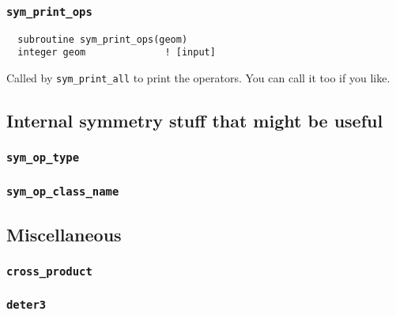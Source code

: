 \subsubsection{{\tt sym\_print\_ops}}
\begin{verbatim}
  subroutine sym_print_ops(geom)
  integer geom              ! [input]
\end{verbatim}
Called by \verb+sym_print_all+ to print the operators.  You can call
it too if you like.

\subsection{Internal symmetry stuff that might be useful}

\subsubsection{{\tt sym\_op\_type}}

\subsubsection{{\tt sym\_op\_class\_name}}

\subsection{Miscellaneous}

\subsubsection{{\tt cross\_product}}

\subsubsection{{\tt deter3}}


